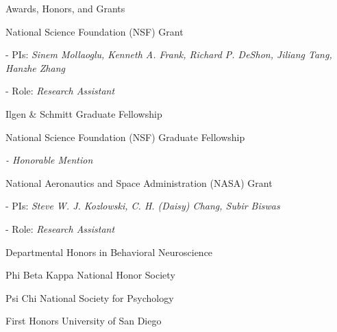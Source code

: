 
\begin{rubric}{Awards, Honors, and Grants}


	

\entry*[2019 - 2021]
	National Science Foundation (NSF) Grant \par
	\hspace{0.5cm} \footnotesize{- PIs:} \footnotesize{\textit{ Sinem Mollaoglu, Kenneth A. Frank, Richard P. DeShon, Jiliang Tang, Hanzhe Zhang}} \par
	\hspace{0.5cm} \footnotesize{- Role:} \footnotesize{\textit{Research Assistant}}
	
	
\entry*[October 2018]
	Ilgen \& Schmitt Graduate Fellowship
	
	
\entry*[April 2018]
	National Science Foundation (NSF) Graduate Fellowship \par
	\hspace{0.5cm} \footnotesize{\textit{- Honorable Mention}}
	
\entry*[2016 - 2019]
	National Aeronautics and Space Administration (NASA) Grant \par
	\hspace{0.5cm} \footnotesize{- PIs:} \footnotesize{\textit{ Steve W. J. Kozlowski, C. H. (Daisy) Chang, Subir Biswas}} \par
	\hspace{0.5cm} \footnotesize{- Role:} \footnotesize{\textit{Research Assistant}}

				
\entry*[May 2016]
	Departmental Honors in Behavioral Neuroscience
	
\entry*[February 2016]
	Phi Beta Kappa National Honor Society
	
\entry*[April 2015]
	Psi Chi National Society for Psychology
	
\entry*[2012 - 2016]
	First Honors University of San Diego
	
\end{rubric}
